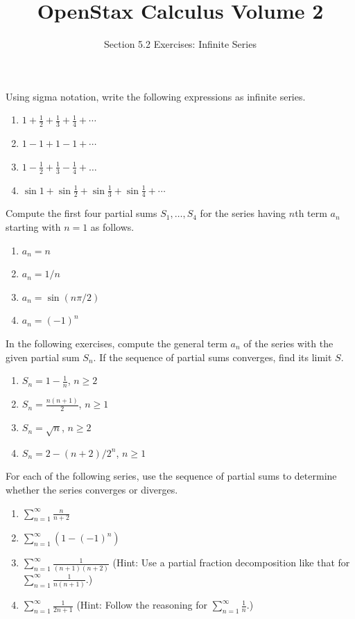 \documentclass{exercises}
\title{OpenStax Calculus Volume 2}
\subtitle{Section 5.2 Exercises: Infinite Series}
\author{}
\date{}
\begin{document}
\maketitle


Using sigma notation, write the following expressions as infinite series.

\begin{enumerate}[start=1]
\item $1+\frac{1}{2}+\frac{1}{3}+\frac{1}{4}+\cdots$
\item $1-1+1-1+\cdots$
\item $1-\frac{1}{2}+\frac{1}{3}-\frac{1}{4}+\ldots$
\item $\sin 1+\sin \frac{1}{2}+\sin \frac{1}{3}+\sin \frac{1}{4}+\cdots$
\end{enumerate}

Compute the first four partial sums $S_{1},\ldots,S_{4}$ for the series having $n$th term $a_{n}$ starting with $n=1$ as follows.

\begin{enumerate}[resume]
\item $a_{n}=n$
\item $a_{n}=1/n$
\item $a_{n}=\sin(n\pi/2)$
\item $a_{n}={(-1)}^{n}$
\end{enumerate}

In the following exercises, compute the general term $a_{n}$ of the series with the given partial sum $S_{n}$. If the sequence of partial sums converges, find its limit $S$.

\begin{enumerate}[resume]
\item $S_{n}=1-\frac{1}{n}$, $n\ge2$
\item $S_{n}=\frac{n(n+1)}{2}$, $n\ge1$
\item $S_{n}=\sqrt{n}$, $n\ge2$
\item $S_{n}=2-(n+2)/2^{n}$, $n\ge1$
\end{enumerate}

For each of the following series, use the sequence of partial sums to determine whether the series converges or diverges.

\begin{enumerate}[resume]
\item $\sum_{n=1}^{\infty}\frac{n}{n+2}$
\item $\sum_{n=1}^{\infty}(1-{(-1)}^{n})$
\item $\sum_{n=1}^{\infty}\frac{1}{(n+1)(n+2)}$ (Hint: Use a partial fraction decomposition like that for $\sum_{n=1}^{\infty}\frac{1}{n(n+1)}$.)
\item $\sum_{n=1}^{\infty}\frac{1}{2n+1}$ (Hint: Follow the reasoning for $\sum_{n=1}^{\infty}\frac{1}{n}$.)
\end{enumerate}
\end{document}
